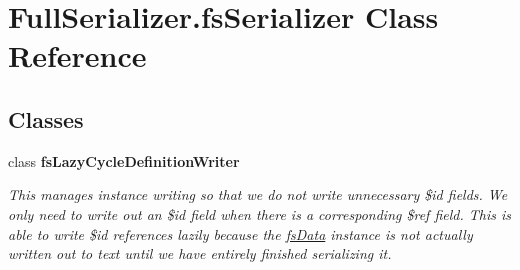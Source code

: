 \hypertarget{class_full_serializer_1_1fs_serializer}{}\section{Full\+Serializer.\+fs\+Serializer Class Reference}
\label{class_full_serializer_1_1fs_serializer}
\subsection*{Classes}
\begin{DoxyCompactItemize}
\item 
class {\bfseries fs\+Lazy\+Cycle\+Definition\+Writer}
\begin{DoxyCompactList}\small\item\em This manages instance writing so that we do not write unnecessary \$id fields. We only need to write out an \$id field when there is a corresponding \$ref field. This is able to write \$id references lazily because the \hyperlink{class_full_serializer_1_1fs_data}{fs\+Data} instance is not actually written out to text until we have entirely finished serializing it. \end{DoxyCompactList}\end{DoxyCompactItemize}
